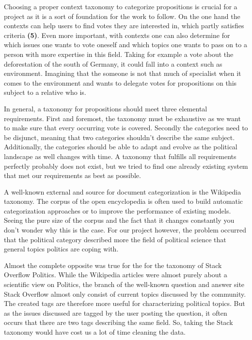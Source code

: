 Choosing a proper context taxonomy to categorize propositions is crucial for a  project as it is a sort of foundation for the work to follow.
On the one hand the contexts can help users to find votes they are interested in, which partly satisfies criteria \textbf{(5)}.
Even more important, with contexts one can also determine for which issues one wants to vote oneself and which topics one wants to pass on to a person with more expertise in this field.
Taking for example a vote about the deforestation of the south of Germany, it could fall into a context such as environment.
Imagining that the someone is not that much of specialist when it comes to the environment and wants to delegate votes for propositions on this subject to a relative who is.

In general, a taxonomy for  propositions should meet three elemental requirements.
First and foremost, the taxonomy must be exhaustive as we want to make sure that every occurring vote is covered.
Secondly the categories need to be disjunct, meaning that two categories shouldn't describe the same subject.
Additionally, the categories should be able to adapt and evolve as the political landscape as well changes with time.
A taxonomy that fulfills all requirements perfectly probably does not exist, but we tried to find one already existing system that met our requirements as best as possible.

A well-known external and source for document categorization is the Wikipedia taxonomy.
The corpus of the open encyclopedia is often used to build automatic categorization approaches or to improve the performance of existing models.
Seeing the pure size of the corpus and the fact that it changes constantly you don’t wonder why this is the case.
For our project however, the problem occurred that the political category described more the field of political science that general topics politics are coping with. 

Almost the complete opposite was true for the for the taxonomy of Stack Overflow Politics.
While the Wikipedia articles were almost purely about a scientific view on Politics, the branch of the well-known question and answer site Stack Overflow almost only consist of current topics discussed by the community.
The created tags are therefore more useful for characterizing political topics.
But as the issues discussed are tagged by the user posting the question, it often occurs that there are two tags describing the same field.
So, taking the Stack taxonomy would have cost us a lot of time cleaning the data. 


